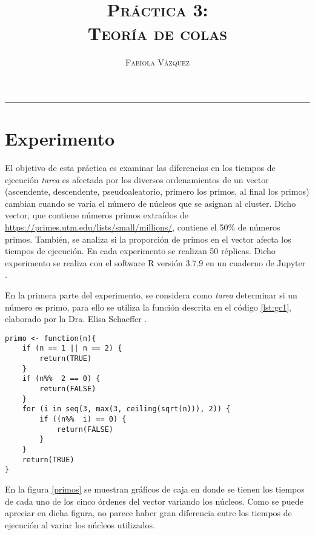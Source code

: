 \documentclass[12pt,letterpaper]{article}
\title{\textsc{Práctica 3: \\Teoría de colas}}
\author{\textsc{Fabiola Vázquez}}
\begin{document}
\maketitle
\hrule
\section{Experimento}
El objetivo de esta práctica \cite{elisap3} es examinar las diferencias en los tiempos de ejecución \textit{tarea} es afectada por los diversos ordenamientos de un vector (ascendente, descendente, pseudoaleatorio, primero los primos, al final los primos) cambian cuando se varía el número de núcleos que se asignan al cluster. Dicho vector, que contiene números primos extraídos de \url{https://primes.utm.edu/lists/small/millions/}, contiene el 50\% de números primos. También, se analiza si la proporción de primos en el vector afecta los tiempos de ejecución. En cada experimento se realizan 50 réplicas. Dicho experimento se realiza con el software R versión 3.7.9 \cite{R} en un cuaderno de Jupyter \cite{jupyter}.

En la primera parte del experimento, se considera como \textit{tarea} determinar si un número es primo, para ello se utiliza la función descrita en el código \ref{lst:gc1}, elaborado por la Dra. Elisa Schaeffer \cite{elisa}.
\begin{lstlisting}[label=lst:gc1,caption=Función para determinar si un número es primo., frame = single]
primo <- function(n){
    if (n == 1 || n == 2) {
        return(TRUE)
    }
    if (n%%  2 == 0) {
        return(FALSE)
    }
    for (i in seq(3, max(3, ceiling(sqrt(n))), 2)) {
        if ((n%%  i) == 0) {
            return(FALSE)
        }
    }
    return(TRUE)
}
\end{lstlisting} 
En la figura \ref{primos} se muestran gráficos de caja en donde se tienen los tiempos de cada uno de los cinco órdenes del vector variando los núcleos. Como se puede apreciar en dicha figura, no parece haber gran diferencia entre los tiempos de ejecución al variar los núcleos utilizados.
\end{document}

